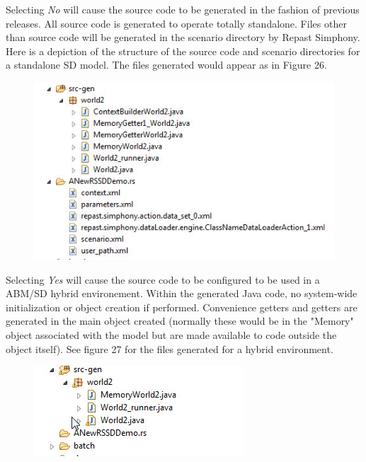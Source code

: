 \documentclass[11pt]{amsart}
\begin{document}
 Selecting \textit{No} will cause the source code to be generated in the fashion of previous releases. All source code is generated to operate totally standalone. Files other than source code will be generated in the scenario directory by Repast Simphony. Here is a depiction of the structure of the source code and scenario directories for a standalone SD model. The files generated would appear as in Figure 26.

\begin{figure}[ht]
\begin{center}
\vspace{.2in}
\centerline {
\includegraphics[totalheight=0.3\textheight]{images/standalone.jpg}
}
\caption{}
\label{fig:026}
\end{center}
\end{figure}

 Selecting \textit{Yes} will cause the source code to be configured to be used in a ABM/SD hybrid environement. Within the generated  Java code, no system-wide initialization or object creation if performed. Convenience getters and getters are generated in the main object created (normally these would be in the "Memory" object associated with the model but are made available to code outside the object itself). See figure 27 for the files generated for a hybrid environment.

\begin{figure}[ht]
\begin{center}
\vspace{.2in}
\centerline {
\includegraphics[totalheight=0.3\textheight]{images/hybrid.jpg}
}
\caption{}
\label{fig:02c}
\end{center}
\end{figure}
\end{document}
